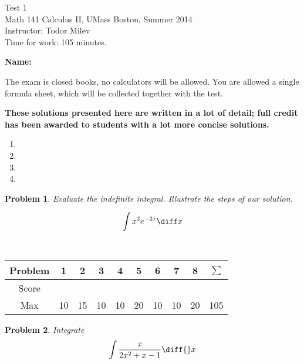 \documentclass{article}
\newtheorem{problem}{Problem}
\begin{document}
\begin{center}
\Large
Test 1\\\normalsize Math 141 Calculus II, UMass Boston, Summer 2014 \\  Instructor: Todor Milev\\ Time for work: 105 minutes.
\end{center}


\noindent \textbf{Name:} \hfill{~}

\noindent The exam is closed books, no calculators will be allowed. You are allowed a single formula sheet, which will be collected together with the test. 

\textbf{These solutions presented here are written in a lot of detail; full credit has been awarded to students with a lot more concise solutions.}

\begin{enumerate}
\item 
\item 

\item 

\item 


\end{enumerate}

\vskip 8cm 

\begin{problem}
Evaluate the indefinite integral. Illustrate the steps of our solution.

\[
\int x^2 e^{-2x}\diff x
\]
\end{problem}
\vskip 10cm

\hfill{~}\begin{tabular}{c|c|c|c|c|c|c|c|c||c}
Problem&1 &2&3&4&5&6&7&8& $\sum$\\ \hline
Score&&&&&&&&&\\ \hline
Max&10 &15 & 10 & 10& 20& 10&10 &20 & 105
\end{tabular} 

\newpage 
\begin{problem} Integrate 
\[
\int \frac{x }{2x^2+x-1}\diff{}x
\]

\end{problem}
\end{document}
